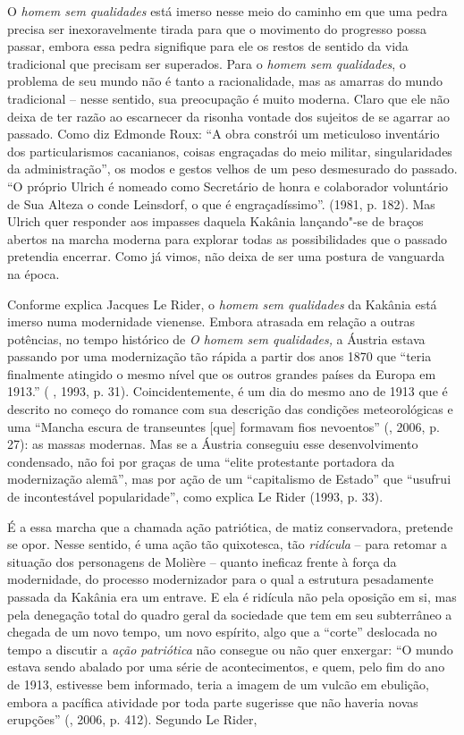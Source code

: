 O \emph{homem sem qualidades} está imerso nesse meio do caminho em que
uma pedra precisa ser inexoravelmente tirada para que o movimento do
progresso possa passar, embora essa pedra signifique para ele os restos
de sentido da vida tradicional que precisam ser superados. Para o
\emph{homem sem qualidades}, o problema de seu mundo não é tanto a
racionalidade, mas as amarras do mundo tradicional -- nesse sentido, sua
preocupação é muito moderna. Claro que ele não deixa de ter razão ao
escarnecer da risonha vontade dos sujeitos de se agarrar ao passado.
Como diz Edmonde Roux: ``A obra constrói um meticuloso inventário dos
particularismos cacanianos, coisas engraçadas do meio militar,
singularidades da administração'', os modos e gestos velhos de um peso
desmesurado do passado. ``O próprio Ulrich é nomeado como Secretário de
honra e colaborador voluntário de Sua Alteza o conde Leinsdorf, o que é
engraçadíssimo''. (1981, p. 182). Mas Ulrich quer responder aos impasses
daquela Kakânia lançando"-se de braços abertos na marcha moderna para
explorar todas as possibilidades que o passado pretendia encerrar. Como
já vimos, não deixa de ser uma postura de vanguarda na época.

Conforme explica Jacques Le Rider, o \emph{homem sem qualidades} da
Kakânia está imerso numa modernidade vienense. Embora atrasada em
relação a outras potências, no tempo histórico de \emph{O homem sem
qualidades,} a Áustria estava passando por uma modernização tão rápida a
partir dos anos 1870 que ``teria finalmente atingido o mesmo nível que
os outros grandes países da Europa em 1913.'' ( , 1993, p. 31).
Coincidentemente, é um dia do mesmo ano de 1913 que é descrito no começo
do romance com sua descrição das condições meteorológicas e uma ``Mancha
escura de transeuntes [que] formavam fios nevoentos'' (, 2006,
p. 27): as massas modernas. Mas se a Áustria conseguiu esse
desenvolvimento condensado, não foi por graças de uma ``elite
protestante portadora da modernização alemã'', mas por ação de um
``capitalismo de Estado'' que ``usufrui de incontestável popularidade'',
como explica Le Rider (1993, p. 33).

É a essa marcha que a chamada ação patriótica, de matiz conservadora,
pretende se opor. Nesse sentido, é uma ação tão quixotesca, tão
\emph{ridícula} -- para retomar a situação dos personagens de Molière --
quanto ineficaz frente à força da modernidade, do processo modernizador
para o qual a estrutura pesadamente passada da Kakânia era um entrave. E
ela é ridícula não pela oposição em si, mas pela denegação total do
quadro geral da sociedade que tem em seu subterrâneo a chegada de um
novo tempo, um novo espírito, algo que a ``corte'' deslocada no tempo a
discutir a \emph{ação patriótica} não consegue ou não quer enxergar: ``O
mundo estava sendo abalado por uma série de acontecimentos, e quem, pelo
fim do ano de 1913, estivesse bem informado, teria a imagem de um vulcão
em ebulição, embora a pacífica atividade por toda parte sugerisse que
não haveria novas erupções'' (, 2006, p. 412). Segundo Le Rider,

